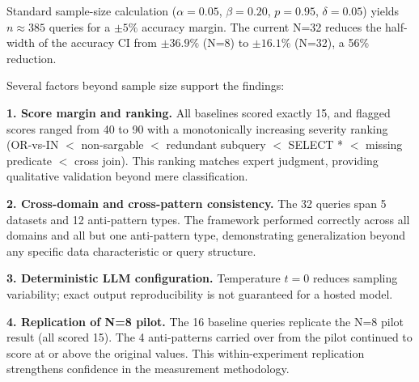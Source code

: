 \documentclass[conference]{IEEEtran}
\begin{document}
\begin{table}[t]
\caption{Confidence Intervals: N=8 vs.\ N=32}
\label{tab:intervals}
\centering
\small
{}
\end{table}

Standard sample-size calculation ($\alpha = 0.05$, $\beta = 0.20$, $p = 0.95$, $\delta = 0.05$) yields $n \approx 385$ queries for a $\pm5\%$ accuracy margin. The current N=32 reduces the half-width of the accuracy CI from $\pm36.9\%$ (N=8) to $\pm16.1\%$ (N=32), a 56\% reduction.

Several factors beyond sample size support the findings:

\noindent\textbf{1. Score margin and ranking.} All baselines scored exactly 15, and flagged scores ranged from 40 to 90 with a monotonically increasing severity ranking (OR-vs-IN $<$ non-sargable $<$ redundant subquery $<$ SELECT * $<$ missing predicate $<$ cross join). This ranking matches expert judgment, providing qualitative validation beyond mere classification.

\noindent\textbf{2. Cross-domain and cross-pattern consistency.} The 32 queries span 5 datasets and 12 anti-pattern types. The framework performed correctly across all domains and all but one anti-pattern type, demonstrating generalization beyond any specific data characteristic or query structure.

\noindent\textbf{3. Deterministic LLM configuration.} Temperature $t=0$ reduces sampling variability; exact output reproducibility is not guaranteed for a hosted model.

\noindent\textbf{4. Replication of N=8 pilot.} The 16 baseline queries replicate the N=8 pilot result (all scored 15). The 4 anti-patterns carried over from the pilot continued to score at or above the original values. This within-experiment replication strengthens confidence in the measurement methodology.
\end{document}
